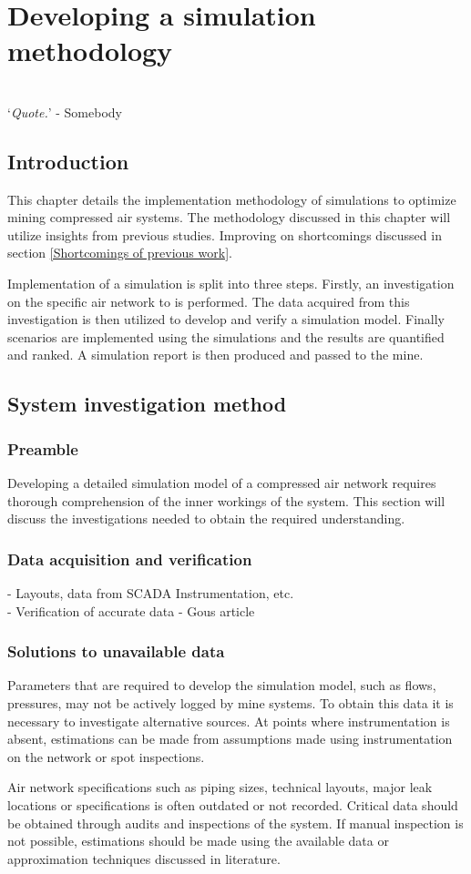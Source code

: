 \chapter{Developing a simulation methodology}
\thispagestyle{empty}
\vspace{38em}
\hrulefill
\\
\enquote*{\textit{Quote.}} - Somebody\\
\newpage
\section{Introduction}
This chapter details the implementation methodology of simulations to optimize mining compressed air systems. The methodology discussed in this chapter will utilize insights from previous studies. Improving on shortcomings discussed in section \ref{Shortcomings of previous work}.
\par 
Implementation of a simulation is split into three steps. Firstly, an investigation on the specific air network to is performed. The data acquired from this investigation is then utilized to develop and verify a simulation model. Finally scenarios are implemented using the simulations and the results are quantified and ranked. A simulation  report is then produced and passed to the mine.
\section{System investigation method}
	\subsection{Preamble}
		Developing a detailed simulation model of a compressed air network requires thorough comprehension of the inner workings of the system. This section will discuss the investigations needed to obtain the required understanding.
	\subsection{Data acquisition and verification} %
		- Layouts, data from SCADA Instrumentation, etc.\\
		- Verification of accurate data - Gous article
	\subsection{Solutions to unavailable data}
		Parameters that are required to develop the simulation model, such as flows, pressures, may not be actively logged by mine systems. To obtain this data it is necessary to investigate alternative sources. At points where instrumentation is absent, estimations can be made from assumptions made using instrumentation on the network or spot inspections.
		\par 
		Air network specifications such as piping sizes, technical layouts, major leak locations or specifications is often outdated or not recorded. Critical data should be obtained through audits and inspections of the system. If manual inspection is not possible, estimations should be made using the available data or approximation techniques discussed in literature. %
